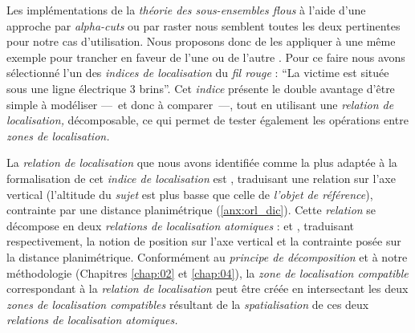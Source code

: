 
Les implémentations de la \emph{théorie des sous-ensembles flous} à
l'aide d'une approche par \emph{alpha-cuts} ou par raster nous
semblent toutes les deux pertinentes pour notre cas
d'utilisation. Nous proposons donc de les appliquer à une même exemple
pour trancher en faveur de l'une ou de l'autre
\autocite{Bunel2019a}. Pour ce faire nous avons sélectionné l'un des
\emph{indices de localisation} du \emph{fil rouge} : \enquote{La
  victime est située sous une ligne électrique 3 brins}. Cet
\emph{indice} présente le double avantage d'être simple à modéliser
---~et donc à comparer~---, tout en utilisant une \emph{relation de
  localisation,} décomposable, ce qui permet de tester également les
opérations entre \emph{zones de localisation.}

La \emph{relation de localisation} que nous avons identifiée comme la
plus adaptée à la formalisation de cet \emph{indice de localisation}
est , traduisant une relation sur l'axe
vertical (l'altitude du \emph{sujet} est plus basse que celle de
\emph{l'objet de référence}), contrainte par une distance
planimétrique (\autoref{anx:orl_dic}). Cette \emph{relation} se
décompose en deux \emph{relations de localisation atomiques} :
 et
,
traduisant respectivement, la notion de position sur l'axe vertical et
la contrainte posée sur la distance planimétrique. Conformément au
\emph{principe de décomposition} et à notre méthodologie (Chapitres
\ref{chap:02} et \ref{chap:04}), la \emph{zone de localisation
  compatible} correspondant à la \emph{relation de localisation}
 peut être créée en intersectant les
deux \emph{zones de localisation compatibles} résultant de la
\emph{spatialisation} de ces deux \emph{relations de localisation
  atomiques.}

